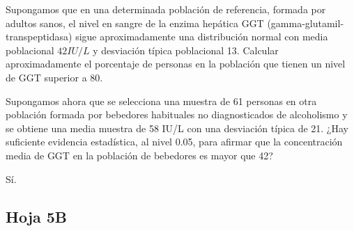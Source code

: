 \begin{problem}[8] 

\ppart Supongamos que en una determinada población de referencia, formada por adultos sanos, el nivel en sangre de la enzima hepática GGT (gamma-glutamil-transpeptidasa) sigue aproximadamente una distribución normal con media poblacional $42 IU/L$ y desviación típica poblacional 13. Calcular aproximadamente el porcentaje de personas en la población que tienen un nivel de GGT superior a 80.

\ppart Supongamos ahora que se selecciona una muestra de 61 personas en otra población formada por bebedores habituales no diagnosticados de alcoholismo y se obtiene una media muestra de 58 IU/L con una desviación típica de 21. ¿Hay suficiente evidencia estadística, al nivel 0.05, para afirmar que la concentración media de GGT en la población de bebedores es mayor que 42?

\solution

Sí. %

\end{problem}

\pagebreak
\subsection{Hoja 5B}

